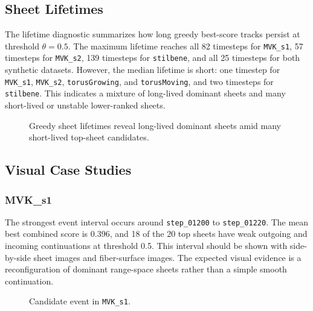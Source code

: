 \subsection{Sheet Lifetimes}

The lifetime diagnostic summarizes how long greedy best-score tracks persist at
threshold \(\theta=0.5\). The maximum lifetime reaches all 82 timesteps for
\texttt{MVK\_s1}, 57 timesteps for \texttt{MVK\_s2}, 139 timesteps for
\texttt{stilbene}, and all 25 timesteps for both synthetic datasets. However,
the median lifetime is short: one timestep for \texttt{MVK\_s1},
\texttt{MVK\_s2}, \texttt{torusGrowing}, and \texttt{torusMoving}, and two
timesteps for \texttt{stilbene}. This indicates a mixture of long-lived
dominant sheets and many short-lived or unstable lower-ranked sheets.

\begin{figure}[t]
  \caption{Greedy sheet lifetimes reveal long-lived dominant sheets amid many
  short-lived top-sheet candidates.}
  \label{fig:lifetime}
\end{figure}

\subsection{Visual Case Studies}

\subsubsection{MVK\_s1}

The strongest event interval occurs around \texttt{step\_01200} to
\texttt{step\_01220}. The mean best combined score is 0.396, and 18 of the 20
top sheets have weak outgoing and incoming continuations at threshold 0.5. This
interval should be shown with side-by-side sheet images and fiber-surface
images. The expected visual evidence is a reconfiguration of dominant
range-space sheets rather than a simple smooth continuation.

\begin{figure}[t]
  \caption{Candidate event in \texttt{MVK\_s1}.}
  \label{fig:mvk-s1-case}
\end{figure}

